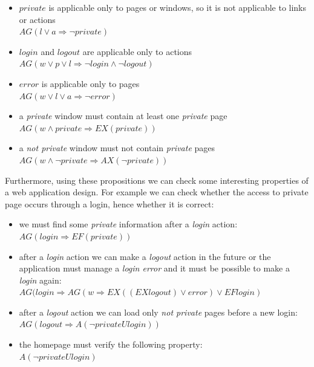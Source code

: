 \footnotesize
\begin {itemize}
	\item $private$ is applicable only to pages or windows, so it is not applicable to links or actions\\$AG(l \vee a \Rightarrow \neg private)$
	\item $ login $ and $ logout$ are applicable only to actions \\$AG(w \vee p \vee l \Rightarrow \neg login \wedge \neg logout)$ 
	\item $ error $ is applicable only to pages\\ $AG(w \vee l \vee a \Rightarrow \neg error)$
	\item a \emph{private} window must contain at least one \emph{private} page\\$AG(w \wedge private \Rightarrow EX(private))$
	\item a \emph{not private} window must not contain \emph{private} pages\\$AG(w \wedge \neg private \Rightarrow AX(\neg private))$ 
\end{itemize}

\normalsize
Furthermore, using these propositions we can check some interesting properties of a web application design. For example we can check whether the access to private page occurs through a login, hence whether it is correct:

\footnotesize
\begin{itemize}
	\item we must find some \emph{private} information after a \emph{login} action: \\ 
$AG(login \Rightarrow EF(private))$

	\item after a \emph{login} action we can make a \emph{logout} action in the future or the application must manage a \emph{login error} and it must be possible to make a \emph{login} again: \\ 
$AG(login \Rightarrow AG(w \Rightarrow EX((EX logout)\vee error)\vee EF login)$

	\item after a \emph{logout} action we can load only \emph{not private} pages before a new login:\\
$AG(logout \Rightarrow A(\neg private U  login))$

	\item the homepage must verify the following property:\\
$A(\neg private U login)$
\end{itemize} 

